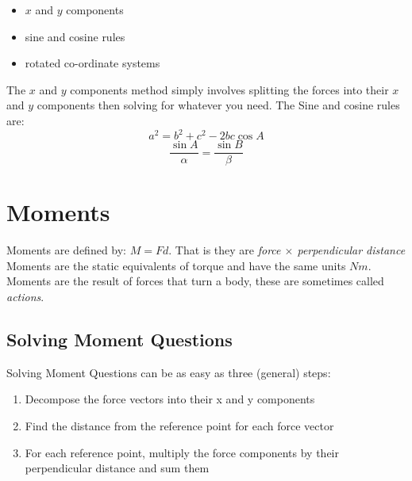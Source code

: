 \documentclass[a4paper, 12pt]{article}
\begin{document}
\begin{itemize}
    \item $x$ and $y$ components 
    \item sine and cosine rules
    \item rotated co-ordinate systems
\end{itemize}
The $x$ and $y$ components method simply involves splitting the forces into their $x$ and $y$ components then solving
for whatever you need. The Sine and cosine rules are:
\begin{equation*}
    a^2 = b^2 + c^2 - 2bc\cos{A} 
\end{equation*}
\begin{equation*}
    \frac{\sin{A}}{\alpha} = \frac{\sin{B}}{\beta} 
\end{equation*}

\section{Moments}
Moments are defined by: $M=Fd$.
That is they are \textit{force $\times$ perpendicular distance}
Moments are the static equivalents of torque and have the same units $Nm$.
Moments are the result of forces that turn a body, these are sometimes called \textit{actions}.
\subsection{Solving Moment Questions}
Solving Moment Questions can be as easy as three (general) steps:
\begin{enumerate}
    \item Decompose the force vectors into their x and y components 
    \item Find the distance from the reference point for each force vector
    \item For each reference point, multiply the force components by their perpendicular distance and sum them 
\end{enumerate}
\newpage
\end{document}
